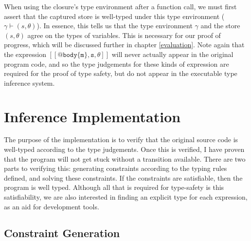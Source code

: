 \documentclass[12pt,a4paper,twoside,openright]{report}
\theoremstyle{definition}
\theoremstyle{dotless}
\begin{document}
When using the closure's type environment after a function call, we must first
assert that the captured store is well-typed under this type environment
($\gamma \vdash (s, \theta)$). In essence, this tells us that the type
environment $\gamma$ and the store $(s, \theta)$ agree on the types of
variables. This is necessary for our proof of progress, which will be discussed
further in chapter \ref{evaluation}. Note again that the expression
$\mathtt{[\![@body\{m\},s,\theta]\!]}$ will never actually appear in the
original program code, and so the type judgements for these kinds of expression
are required for the proof of type safety, but do not appear in the executable
type inference system.

\section{Inference Implementation}
The purpose of the implementation is to verify that the original source code is
well-typed according to the type judgements. Once this is verified, I have
proven that the program will not get stuck without a transition available.
There are two parts to verifying this: generating constraints according to the
typing rules defined, and solving these constraints. If the constraints are
satisfiable, then the program is well typed. Although all that is required for
type-safety is this satisfiability, we are also interested in finding an
explicit type for each expression, as an aid for development tools.

\subsection{Constraint Generation}
\end{document}
